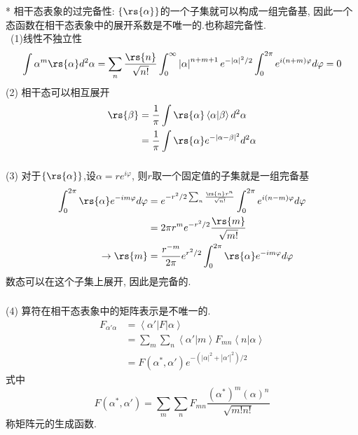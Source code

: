 \begin{frame} 
\frametitle{}
     * 相干态表象的过完备性: $\{\rs{\alpha}\}$的一个子集就可以构成一组完备基, 因此一个态函数在相干态表象中的展开系数是不唯一的.也称超完备性. \\ {\vspace*{0.3em}}
     \证~(1)线性不独立性
     \[ \begin{aligned}
         \int \alpha ^m \rs{\alpha} d^2 \alpha &= \sum_n \frac{\rs{n}}{\sqrt{n!}} \int_0 ^\infty \left|\alpha\right|^{n+m+1} e ^ {- \left|\alpha\right|^2 /2} \int_0 ^{2\pi} e ^{i(n+m)\varphi}  d \varphi =0\\
     \end{aligned}\] 
     (2) 相干态可以相互展开
     \[ \begin{aligned}
        \rs{ \beta } & = \frac{1}{\pi} \int \rs{\alpha} \left\langle \alpha | \beta \right\rangle  d ^2 \alpha \\ 
        &= \frac{1}{\pi} \int \rs{\alpha} e^{-  \left| \alpha - \beta\right|^2}  d ^2 \alpha
    \end{aligned}\] 
\end{frame}

\begin{frame} 
\frametitle{}
     (3) 对于$\{\rs{\alpha}\}$,设$\alpha = r e ^{i \varphi}$, 则$r$取一个固定值的子集就是一组完备基
      \[ \begin{aligned}
          \int _0 ^{2\pi} \rs{\alpha} e ^{-i m \varphi} d \varphi &= e^{- r^2 /2 \sum_n \frac{\rs{n} r^n}{\sqrt{n!}} } \int _0 ^{2\pi} e ^{i (n-m) \varphi} d \varphi \\
          &= 2\pi r^m e^{- r^2 /2}  \frac{\rs{m}}{\sqrt{m!}} \\
        \to \rs{m} &= \frac{r^{-m}}{2\pi}e^{ r^2 /2}  \int _0 ^{2\pi} \rs{\alpha} e ^{-i m \varphi} d \varphi 
      \end{aligned}\] 
      数态可以在这个子集上展开, 因此是完备的. 
\end{frame}

\begin{frame} 
\frametitle{}
      (4) 算符在相干态表象中的矩阵表示是不唯一的.
    \[\begin{aligned}
         F_{\alpha' \alpha} &= \left\langle \alpha' | F |\alpha \right\rangle \\ 
         &= \sum_m \sum_n  \left\langle \alpha' |m \right\rangle F_{mn} \left\langle n |\alpha \right\rangle \\
         &= F(\alpha^*, \alpha')e^{-(\left|\alpha\right|^2+ \left|\alpha'\right|^2)/2}  
    \end{aligned} \]
      式中 \[F(\alpha^*, \alpha')= \sum_m \sum_n F_{mn} \frac{(\alpha^*)^m (\alpha)^n}{\sqrt{m! n!}}\]
     称矩阵元的生成函数.
\end{frame}

